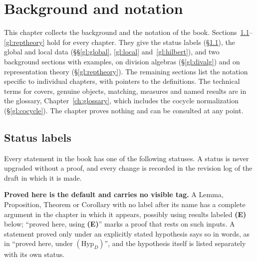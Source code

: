 \chapter{Background and notation}\label{ch:notation}\label{I:sec:glossary}\label{II:sec:glossary}\label{III:sec:glossary}
This chapter collects the background and the notation of the book. Sections~\ref{gl:labels}--\ref{gl:reptheory} hold for every chapter. They give the status labels (\S\ref{gl:labels}), the global and local data (\S\S\ref{gl:global}, \ref{gl:local} and~\ref{gl:hilbert}), and two background sections with examples, on division algebras (\S\ref{gl:divalg}) and on representation theory (\S\ref{gl:reptheory}). The remaining sections list the notation specific to individual chapters, with pointers to the definitions. The technical terms for covers, genuine objects, matching, measures and named results are in the glossary, Chapter~\ref{ch:glossary}, which includes the cocycle normalization (\S\ref{gl:cocycle}). The chapter proves nothing and can be consulted at any point.

\section{Status labels}\label{gl:labels}
Every statement in the book has one of the following statuses. A
status is never upgraded without a proof, and every change is
recorded in the revision log of the draft in which it is made.

\textbf{Proved here is the default and carries no visible tag.}
A Lemma, Proposition, Theorem or Corollary with no label after its
name has a complete argument in the chapter in which it appears,
possibly using results labeled \textbf{(E)} below; ``proved here, using
\textbf{(E)}'' marks a proof that rests on such inputs. A
statement proved only under an explicitly stated hypothesis says so
in words, as in ``proved here, under $(\mathrm{Hyp}_D)$'', and the
hypothesis itself is listed separately with its own status.

